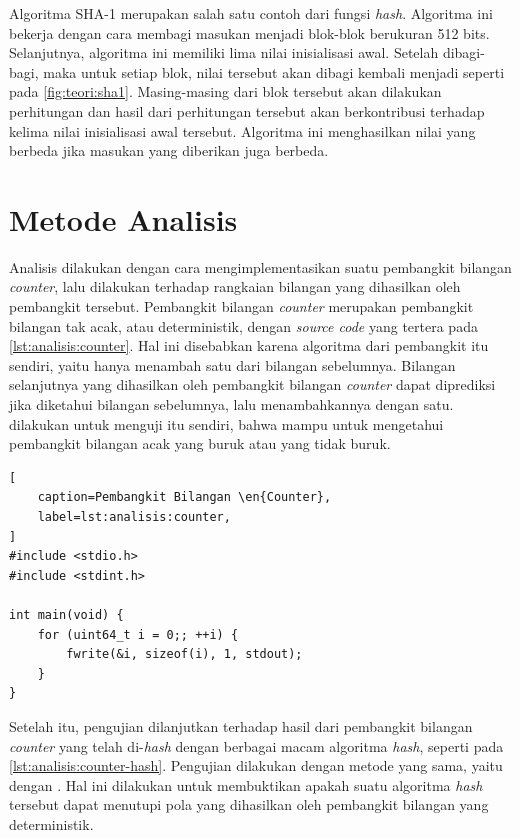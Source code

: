 \documentclass[conference]{IEEEtran}
\newcommand{\en}[1]
    {\foreignlanguage{english}{\textit{#1}}}
\begin{document}
Algoritma SHA-1 merupakan salah satu contoh dari fungsi \en{hash}.
Algoritma ini bekerja dengan cara membagi masukan menjadi blok-blok berukuran 512 bits.
Selanjutnya, algoritma ini memiliki lima nilai inisialisasi awal.
Setelah dibagi-bagi, maka untuk setiap blok, nilai tersebut akan dibagi kembali menjadi seperti pada \autoref{fig:teori:sha1}.
Masing-masing dari blok tersebut akan dilakukan perhitungan dan hasil dari perhitungan tersebut akan berkontribusi terhadap kelima nilai inisialisasi awal tersebut.
Algoritma ini menghasilkan nilai yang berbeda jika masukan yang diberikan juga berbeda.

\section{Metode Analisis}
\label{sec:analisis}

Analisis dilakukan dengan cara mengimplementasikan suatu pembangkit bilangan \en{counter}, lalu dilakukan  terhadap rangkaian bilangan yang dihasilkan oleh pembangkit tersebut.
Pembangkit bilangan \en{counter} merupakan pembangkit bilangan tak acak, atau deterministik, dengan \en{source code} yang tertera pada \autoref{lst:analisis:counter}.
Hal ini disebabkan karena algoritma dari pembangkit itu sendiri, yaitu hanya menambah satu dari bilangan sebelumnya.
Bilangan selanjutnya yang dihasilkan oleh pembangkit bilangan \en{counter} dapat diprediksi jika diketahui bilangan sebelumnya, lalu menambahkannya dengan satu.
 dilakukan untuk menguji  itu sendiri, bahwa  mampu untuk mengetahui pembangkit bilangan acak yang buruk atau yang tidak buruk.

\begin{lstlisting}[
    caption=Pembangkit Bilangan \en{Counter},
    label=lst:analisis:counter,
]
#include <stdio.h>
#include <stdint.h>

int main(void) {
    for (uint64_t i = 0;; ++i) {
        fwrite(&i, sizeof(i), 1, stdout);
    }
}
\end{lstlisting}

Setelah itu, pengujian dilanjutkan terhadap hasil dari pembangkit bilangan \en{counter} yang telah di-\en{hash} dengan berbagai macam algoritma \en{hash}, seperti pada \autoref{lst:analisis:counter-hash}.
Pengujian dilakukan dengan metode yang sama, yaitu dengan .
Hal ini dilakukan untuk membuktikan apakah suatu algoritma \en{hash} tersebut dapat menutupi pola yang dihasilkan oleh pembangkit bilangan yang deterministik.
\end{document}

